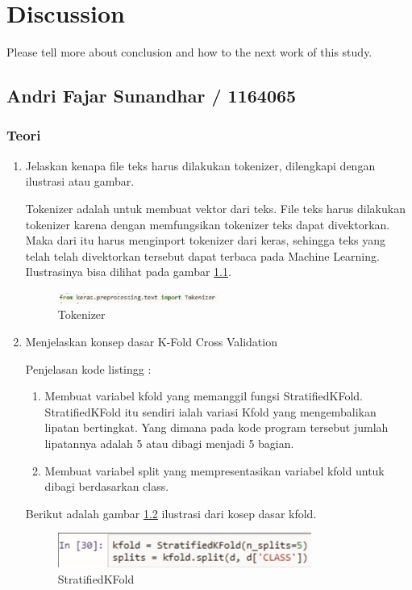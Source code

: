 \chapter{Discussion}
Please tell more about conclusion and how to the next work of this study.

\section{Andri Fajar Sunandhar / 1164065}
\subsection{Teori}
\begin{enumerate}

\item Jelaskan kenapa file teks harus dilakukan tokenizer, dilengkapi dengan ilustrasi atau gambar.
	\par Tokenizer adalah untuk membuat vektor dari teks. File teks harus dilakukan tokenizer karena dengan memfungsikan tokenizer teks dapat divektorkan. Maka dari itu harus menginport tokenizer dari keras, sehingga teks yang telah telah divektorkan tersebut dapat terbaca pada Machine Learning. Ilustrasinya bisa dilihat pada gambar \ref{no1}.
	\begin{figure}[ht]
	\centerline{\includegraphics[width=0.5\textwidth]{figures/chapter7/no1.jpg}}
	\caption{Tokenizer}
	\label{no1}
	\end{figure}

\item Menjelaskan konsep dasar K-Fold Cross Validation
	
	\par Penjelasan kode listingg :
	\begin{enumerate}
	\item Membuat variabel kfold yang memanggil fungsi StratifiedKFold. StratifiedKFold itu sendiri ialah variasi Kfold yang mengembalikan lipatan bertingkat. Yang dimana pada kode program tersebut jumlah lipatannya adalah 5 atau dibagi menjadi 5 bagian.
	\item Membuat variabel split yang mempresentasikan variabel kfold untuk dibagi berdasarkan class.
	\end{enumerate}
	
	\par Berikut adalah gambar  \ref{A2} ilustrasi dari kosep dasar kfold.
		\begin{figure}[!hbtp]
		\centering
		\includegraphics[scale=0.4]{figures/chapter7/no2.jpg}
		\caption{StratifiedKFold}
		\label{A2}
		\end{figure}


\end{enumerate}
